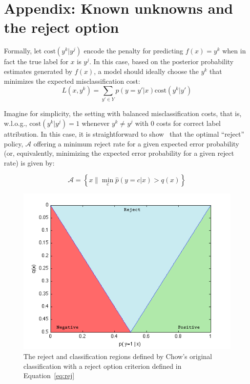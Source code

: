 \appendix
\section{Appendix: Known unknowns and the reject option}
\label{app:reject}

Formally, let $\mbox{cost}(y^k | y^j)$ encode the penalty for predicting $f(x) = y^k$ when in fact the true label for $x$ is $y^j$. In this case, based on the posterior probability estimates generated by $f(x)$, a model should ideally choose the $y^k$ that minimizes the expected misclassification cost: $$L(x, y^k) = \sum_{y' \in Y} p(y = y' | x) \mbox{cost}(y^k | y')$$

Imagine for simplicity, the setting with balanced misclassification costs, that is, w.l.o.g., $\mbox{cost}(y^k | y^j) = 1$ whenever $y^k \neq y^j$ with $0$ costs for correct label attribution.  In this case, it is straightforward to show~\cite{chow:57,chow:70} that the optimal ``reject'' policy, $\mathcal{A}$ offering a minimum reject rate for a given expected error probability (or, equivalently, minimizing the expected error probability for a given reject rate) is given by:

\begin{equation}
\mathcal{A} = \left\{ x \| \min_c \hat{p}(y = c | x) > q(x) \right\}
\label{eq:rej}
\end{equation}

\begin{figure}[hbt]
\begin{center}
\includegraphics[width= .95 \columnwidth]{plots/reject_decision_bounds_fill.png}
\end{center}
\caption{The reject and classification regions defined by Chow's original classification with a reject option criterion defined in Equation~\ref{eq:rej}}
\label{fig:rejectdecision}
\end{figure}

